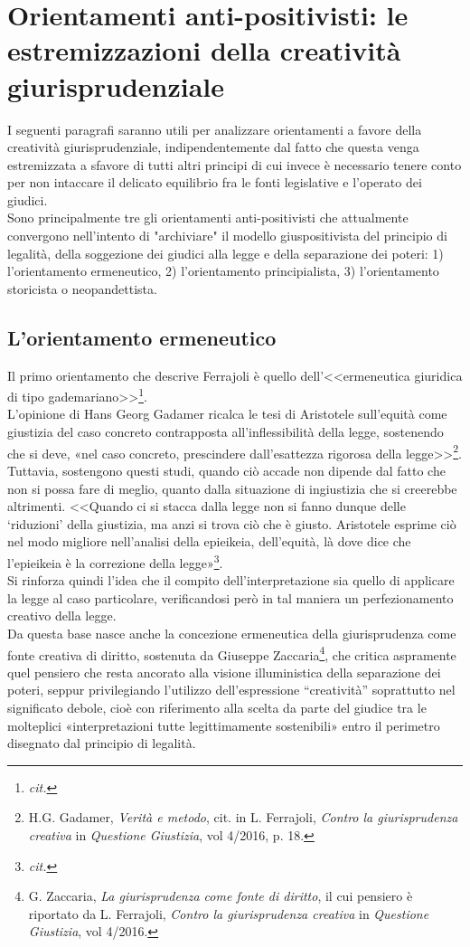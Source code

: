 \section{Orientamenti anti-positivisti: le estremizzazioni della creatività giurisprudenziale} 
I seguenti paragrafi saranno utili per analizzare orientamenti a favore della creatività giurisprudenziale, indipendentemente dal fatto che questa venga estremizzata a sfavore di tutti altri principi di cui invece è necessario tenere conto per non intaccare il delicato equilibrio fra le fonti legislative e l'operato dei giudici.
\\Sono principalmente tre gli orientamenti anti-positivisti che attualmente convergono nell’intento di "archiviare" il modello giuspositivista del principio di legalità, della soggezione dei giudici alla legge e della separazione dei poteri: 1) l’orientamento ermeneutico, 2) l'orientamento principialista, 3) l'orientamento storicista o neopandettista.

\subsection{L'orientamento ermeneutico}
Il primo orientamento che descrive Ferrajoli è quello dell’<<ermeneutica giuridica di tipo gademariano>>\footnote{\textit{cit.}}. 
\\L'opinione di Hans Georg Gadamer ricalca le tesi di Aristotele sull’equità come giustizia del caso concreto contrapposta all’inflessibilità della legge, sostenendo che si deve, «nel caso concreto, prescindere dall’esattezza rigorosa della legge>>\footnote{H.G. Gadamer, \textit{Verità e metodo}, cit. in L. Ferrajoli, \textit{Contro la giurisprudenza creativa} in \textit{Questione Giustizia}, vol 4/2016, p. 18.}. Tuttavia, sostengono questi studi, quando ciò accade non dipende dal fatto che non si possa fare di meglio, quanto dalla situazione di ingiustizia che si creerebbe altrimenti. <<Quando ci si stacca dalla legge non si fanno dunque delle ‘riduzioni’ della giustizia, ma anzi si trova ciò che è giusto. Aristotele esprime ciò nel modo migliore nell’analisi della epieikeia, dell’equità, là dove dice che l’epieikeia è la correzione della legge»\footnote{\textit{cit.}}.
\\Si rinforza quindi l'idea che il compito dell'interpretazione sia quello di applicare la legge al caso particolare, verificandosi però in tal maniera un perfezionamento creativo della legge. 
\\Da questa base nasce anche la concezione ermeneutica della giurisprudenza come fonte creativa di diritto, sostenuta da Giuseppe Zaccaria\footnote{G. Zaccaria, \textit{La giurisprudenza come fonte di diritto}, il cui pensiero è riportato da L. Ferrajoli, \textit{Contro la giurisprudenza creativa} in \textit{Questione Giustizia}, vol 4/2016.}, che critica aspramente quel pensiero che resta ancorato alla visione illuministica della separazione dei poteri, seppur privilegiando l'utilizzo dell’espressione “creatività” soprattutto nel significato debole, cioè con riferimento alla scelta da parte del giudice tra le molteplici «interpretazioni tutte legittimamente sostenibili» entro il perimetro disegnato dal principio di legalità.


